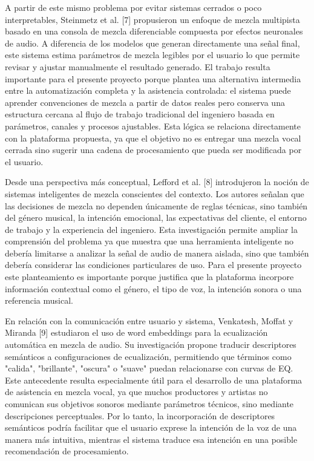 \documentclass[12pt]{article}
\begin{document}
A partir de este mismo problema por evitar sistemas cerrados o poco interpretables, Steinmetz et al. [7] propusieron un enfoque de mezcla multipista basado en una consola de mezcla diferenciable compuesta por efectos neuronales de audio. A diferencia de los modelos que generan directamente una señal final, este sistema estima parámetros de mezcla legibles por el usuario lo que permite revisar y ajustar manualmente el resultado generado. El trabajo resulta importante para el presente proyecto porque plantea una alternativa intermedia entre la automatización completa y la asistencia controlada: el sistema puede aprender convenciones de mezcla a partir de datos reales pero conserva una estructura cercana al flujo de trabajo tradicional del ingeniero basada en parámetros, canales y procesos ajustables. Esta lógica se relaciona directamente con la plataforma propuesta, ya que el objetivo no es entregar una mezcla vocal cerrada sino sugerir una cadena de procesamiento que pueda ser modificada por el usuario.

Desde una perspectiva más conceptual, Lefford et al. [8] introdujeron la noción de sistemas inteligentes de mezcla conscientes del contexto. Los autores señalan que las decisiones de mezcla no dependen únicamente de reglas técnicas, sino también del género musical, la intención emocional, las expectativas del cliente, el entorno de trabajo y la experiencia del ingeniero. Esta investigación permite ampliar la comprensión del problema ya que muestra que una herramienta inteligente no debería limitarse a analizar la señal de audio de manera aislada, sino que también debería considerar las condiciones particulares de uso. Para el presente proyecto este planteamiento es importante porque justifica que la plataforma incorpore información contextual como el género, el tipo de voz, la intención sonora o una referencia musical.

En relación con la comunicación entre usuario y sistema, Venkatesh, Moffat y Miranda [9] estudiaron el uso de word embeddings para la ecualización automática en mezcla de audio. Su investigación propone traducir descriptores semánticos a configuraciones de ecualización, permitiendo que términos como "calida", "brillante", "oscura" o "suave" puedan relacionarse con curvas de EQ. Este antecedente resulta especialmente útil para el desarrollo de una plataforma de asistencia en mezcla vocal, ya que muchos productores y artistas no comunican sus objetivos sonoros mediante parámetros técnicos, sino mediante descripciones perceptuales. Por lo tanto, la incorporación de descriptores semánticos podría facilitar que el usuario exprese la intención de la voz de una manera más intuitiva, mientras el sistema traduce esa intención en una posible recomendación de procesamiento.
\end{document}
